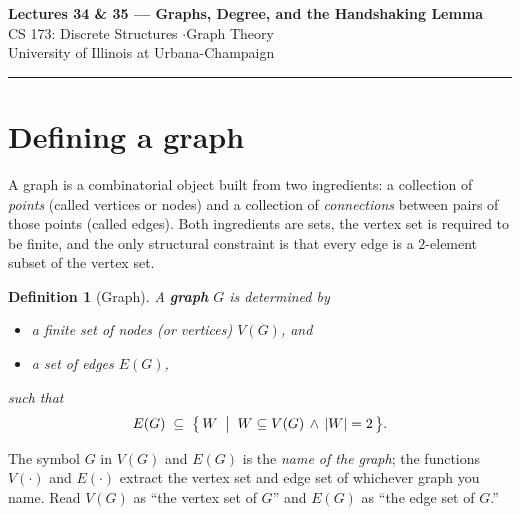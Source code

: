\documentclass[11pt]{article}
\theoremstyle{defstyle}
\newtheorem{definition}{Definition}[section]
\theoremstyle{thmstyle}
\theoremstyle{notstyle}
\theoremstyle{cautionstyle}
\begin{document}
\begin{center}
  {\Large\bfseries Lectures 34 \& 35 --- Graphs, Degree, and the Handshaking Lemma}\\[4pt]
  {\normalsize CS 173: Discrete Structures \quad$\cdot$\quad Graph Theory}\\[2pt]
  {\small\color{gray} University of Illinois at Urbana-Champaign}
\end{center}
\vspace{1em}\hrule\vspace{1.5em}

\section{Defining a graph}

A graph is a combinatorial object built from two ingredients: a collection
of \emph{points} (called vertices or nodes) and a collection of
\emph{connections} between pairs of those points (called edges). Both
ingredients are sets, the vertex set is required to be finite, and the only
structural constraint is that every edge is a $2$-element subset of the
vertex set.

\begin{defbox}
\begin{definition}[Graph]
A \textbf{graph} $G$ is determined by
\begin{itemize}[leftmargin=2em, itemsep=2pt]
  \item a \emph{finite} set of \emph{nodes} (or \emph{vertices}) $V(G)$, and
  \item a set of \emph{edges} $E(G)$,
\end{itemize}
such that
\[
  E(G) \;\subseteq\; \bigl\{\, W \;\bigm|\; W \subseteq V(G) \,\wedge\, |W| = 2 \,\bigr\}.
\]
\end{definition}
\end{defbox}

The symbol $G$ in $V(G)$ and $E(G)$ is the \emph{name of the graph}; the
functions $V(\cdot)$ and $E(\cdot)$ extract the vertex set and edge set of
whichever graph you name. Read $V(G)$ as ``the vertex set of $G$'' and
$E(G)$ as ``the edge set of $G$.''
\end{document}
